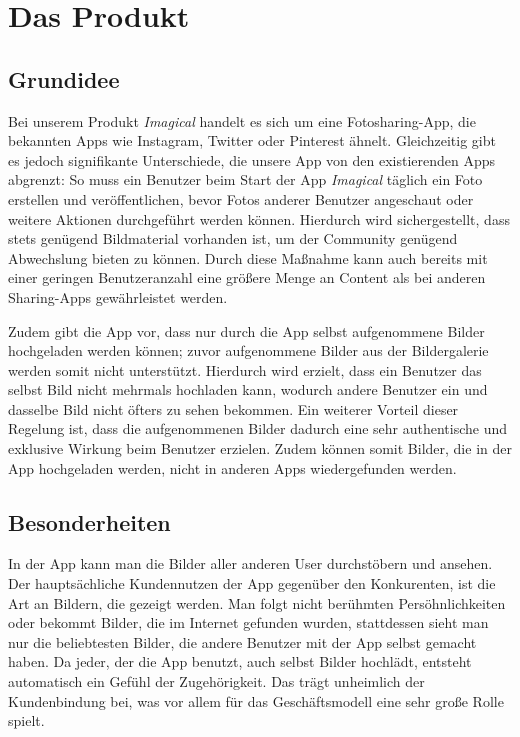 \chapter{Das Produkt}


\section{Grundidee}

Bei unserem Produkt \textit{Imagical} handelt es sich um eine Fotosharing-App, die bekannten Apps wie Instagram, Twitter oder Pinterest ähnelt. Gleichzeitig gibt es jedoch signifikante Unterschiede, die unsere App von den existierenden Apps abgrenzt:
So muss ein Benutzer beim Start der App \textit{Imagical} täglich ein Foto erstellen und veröffentlichen, bevor Fotos anderer Benutzer angeschaut oder weitere Aktionen durchgeführt werden können. Hierdurch wird sichergestellt, dass stets genügend Bildmaterial vorhanden ist, um der Community genügend Abwechslung bieten zu können. Durch diese Maßnahme kann auch bereits mit einer geringen Benutzeranzahl eine größere Menge an Content als bei anderen Sharing-Apps gewährleistet werden.

Zudem gibt die App vor, dass nur durch die App selbst aufgenommene Bilder hochgeladen werden können; zuvor aufgenommene Bilder aus der Bildergalerie werden somit nicht unterstützt.
Hierdurch wird erzielt, dass ein Benutzer das selbst Bild nicht mehrmals hochladen kann, wodurch andere Benutzer ein und dasselbe Bild nicht öfters zu sehen bekommen.
Ein weiterer Vorteil dieser Regelung ist, dass die aufgenommenen Bilder dadurch eine sehr authentische und exklusive Wirkung beim Benutzer erzielen. Zudem können somit Bilder, die in der App hochgeladen werden, nicht in anderen Apps wiedergefunden werden.

\section{Besonderheiten}

In der App kann man die Bilder aller anderen User durchstöbern und ansehen. Der hauptsächliche Kundennutzen der App gegenüber den Konkurenten, ist die Art an Bildern, die gezeigt werden. Man folgt nicht berühmten Persöhnlichkeiten oder bekommt Bilder, die im Internet gefunden wurden, stattdessen sieht man nur die beliebtesten Bilder, die andere Benutzer mit der App selbst gemacht haben. Da jeder, der die App benutzt, auch selbst Bilder hochlädt, entsteht automatisch ein Gefühl der Zugehörigkeit. Das trägt unheimlich der Kundenbindung bei, was vor allem für das Geschäftsmodell eine sehr große Rolle spielt.

